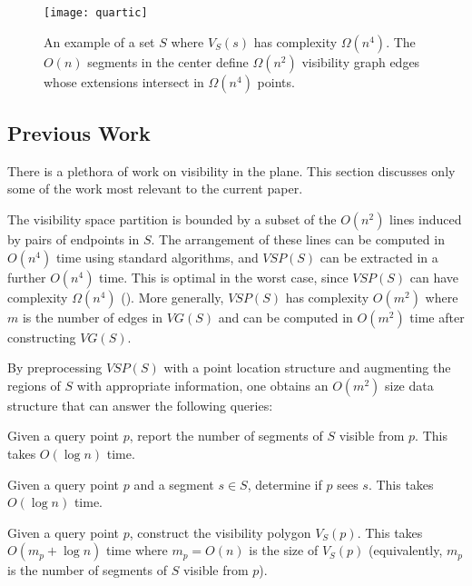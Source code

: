 \documentclass{patmorin}
\newcommand{\VG}{\mathit{VG}}
\newcommand{\VSP}{\mathit{VSP}}
\begin{document}
\begin{figure}
  \begin{center}
    \texttt{[image: quartic]}
  \end{center}
  \caption{An example of a set $S$ where $V_S(s)$ has complexity
   $\Omega(n^4)$. The $O(n)$ segments in the center define $\Omega(n^2)$
   visibility graph edges whose extensions intersect in $\Omega(n^4)$ points.}
\end{figure}

\subsection{Previous Work}

There is a plethora of work on visibility in the plane.  This section
discusses only some of the work most relevant to the current paper.

The visibility space partition is bounded by a subset of the $O(n^2)$ lines
induced by pairs of endpoints in $S$. The arrangement of these lines can be
computed in $O(n^4)$ time using standard algorithms, and $\VSP(S)$ can be
extracted in a further $O(n^4)$ time.  This is optimal in the worst case,
since $\VSP(S)$ can have complexity $\Omega(n^4)$ \cite[Figure~8.13]{o87}
().  More generally, $\VSP(S)$ has complexity $O(m^2)$
where $m$ is the number of edges in $\VG(S)$ and can be computed in
$O(m^2)$ time after constructing $\VG(S)$.

By preprocessing $\VSP(S)$ with a point location structure and augmenting
the regions of $S$ with appropriate information, one obtains an $O(m^2)$
size data structure that can answer the following queries:

\begin{prb}
  Given a query point $p$, report the number of segments of $S$ visible
  from $p$.  This takes $O(\log n)$ time.
\end{prb}

\begin{prb}
  Given a query point $p$ and a segment $s\in S$, determine if $p$
  sees $s$.  This takes $O(\log n)$ time.
\end{prb}

\begin{prb}
  Given a query point $p$, construct the visibility polygon $V_S(p)$.
  This takes $O(m_p+\log n)$ time where $m_p=O(n)$ is the size of $V_S(p)$
  (equivalently, $m_p$ is the number of segments of $S$ visible from $p$).
\end{prb}
\end{document}

